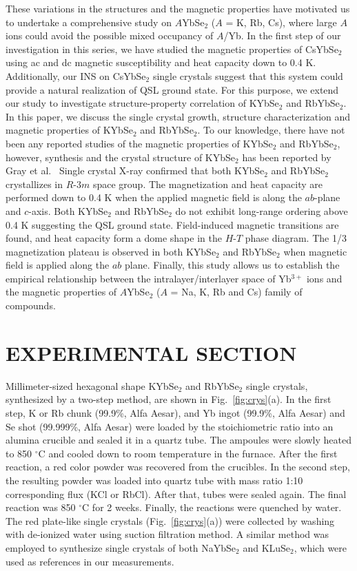 \documentclass[%
 aip,
 amsmath,amssymb,
 reprint,%
]{revtex4-1}
\begin{document}
These variations in the structures and the magnetic properties have motivated us to undertake a comprehensive study on $A$YbSe$_2$ ($A$ = K, Rb, Cs), where large $A$ ions could avoid the possible mixed occupancy of $A$/Yb. In the first step of our investigation in this series, we have studied the magnetic properties of CsYbSe$_2$ using ac and dc magnetic susceptibility and heat capacity down to 0.4 K.\cite{xing2019,PhysRevB.100.220407} Additionally, our INS on CsYbSe$_2$ single crystals suggest that this system could provide a natural realization of QSL ground state\cite{xie2021field}. For this purpose, we extend our study to investigate structure-property correlation of KYbSe$_2$ and RbYbSe$_2$.  
In this paper, we discuss the single crystal growth, structure characterization and magnetic properties of KYbSe$_2$ and RbYbSe$_2$. To our knowledge, there have not been any reported studies of the magnetic properties of KYbSe$_2$ and RbYbSe$_2$, however, synthesis and the crystal structure of KYbSe$_2$ has been reported by Gray et al.~\cite{gray2003crystal} Single crystal X-ray confirmed that both KYbSe$_2$ and RbYbSe$_2$ crystallizes in $R$-3$m$ space group. The magnetization and heat capacity are performed down to 0.4 K when the applied magnetic field is along the $ab$-plane and $c$-axis. Both KYbSe$_2$ and RbYbSe$_2$ do not exhibit long-range ordering above 0.4 K suggesting the QSL ground state. Field-induced magnetic transitions are found, and heat capacity form a dome shape in the $H$-$T$ phase diagram. The 1/3 magnetization plateau is observed in both KYbSe$_2$ and RbYbSe$_2$ when magnetic field is applied along the $ab$ plane. Finally, this study allows us to establish the empirical relationship between the intralayer/interlayer space of Yb$^{3+}$ ions and the magnetic properties of $A$YbSe$_2$ ($A$ = Na, K, Rb and Cs) family of compounds.

\section{\label{sec:level1}EXPERIMENTAL SECTION}

Millimeter-sized hexagonal shape KYbSe$_2$ and RbYbSe$_2$ single crystals, synthesized by a two-step method, are shown in Fig.~\ref{fig:crys}(a). In the first step, K or Rb chunk (99.9\%, Alfa Aesar), and Yb ingot (99.9\%, Alfa Aesar) and Se shot (99.999\%, Alfa Aesar) were loaded by the stoichiometric ratio into an alumina crucible and sealed it in a quartz tube. The ampoules were slowly heated to 850 $^{\circ}$C and cooled down to room temperature in the furnace. After the first reaction, a red color powder was recovered from the crucibles. In the second step, the resulting powder was loaded into quartz tube with mass ratio 1:10 corresponding flux (KCl or RbCl). After that, tubes were sealed again. The final reaction was 850 $^{\circ}$C for 2 weeks. Finally, the reactions were quenched by water. The red plate-like single crystals (Fig.~\ref{fig:crys}(a)) were collected by washing with de-ionized water using suction filtration method. A similar method was employed to synthesize single crystals of both NaYbSe$_2$ and KLuSe$_2$, which were used as references in our measurements. 
\end{document}
